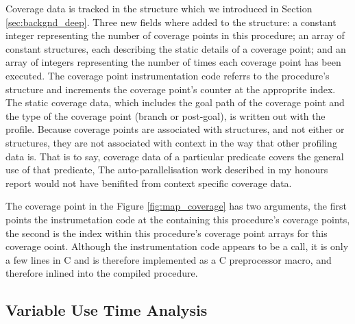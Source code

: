 Coverage data is tracked in the \PS structure
which we introduced in Section \ref{sec:backgnd_deep}.
Three new fields where added to the \PS structure:
a constant integer representing the number of coverage points in this
procedure;
an array of constant structures,
each describing the static details of a coverage point;
and an array of integers representing the number of times each coverage
point has been executed.
The coverage point instrumentation code referrs to the procedure's \PS
structure and increments the coverage point's counter at the approprite index.
The static coverage data,
which includes the goal path of the coverage point and the type of the
coverage point (branch or post-goal),
is written out with the profile.
Because coverage points are associated with \PS structures,
and not either \PD or \CSD structures,
they are not associated with context in the way that other profiling
data is.
That is to say,
coverage data of a particular predicate covers the general use of that
predicate,
The auto-parallelisation work described in my honours report
\citep{pbone_hons}
would not have benifited from context specific coverage data.

The coverage point in the Figure \ref{fig:map_coverage}
has two arguments,
the first points the instrumetation code at the \PS containing
this procedure's coverage points,
the second is the index within this procedure's coverage point arrays
for this coverage ooint.
Although the instrumentation code appears to be a call,
it is only a few lines in C and is therefore implemented as a C
preprocessor macro, and therefore inlined into the compiled procedure. 


\subsection{Variable Use Time Analysis}
\label{sec:var_use_analysis}


